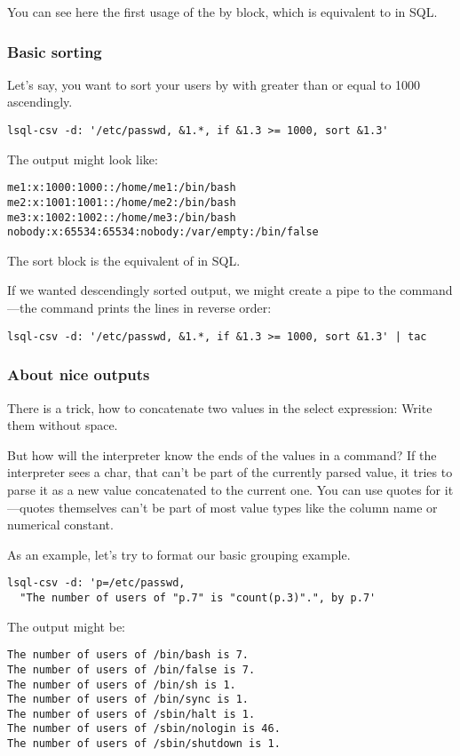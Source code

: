 You can see here the first usage of the by block, which is equivalent to  in SQL.

\subsubsection{Basic sorting}
Let's say, you want to sort your users by  with  greater than or equal to 1000 ascendingly.
\begin{verbatim}
lsql-csv -d: '/etc/passwd, &1.*, if &1.3 >= 1000, sort &1.3'
\end{verbatim}
The output might look like:
\begin{verbatim}
me1:x:1000:1000::/home/me1:/bin/bash
me2:x:1001:1001::/home/me2:/bin/bash
me3:x:1002:1002::/home/me3:/bin/bash
nobody:x:65534:65534:nobody:/var/empty:/bin/false
\end{verbatim}

The sort block is the equivalent of  in SQL.

If we wanted descendingly sorted output, we might create a pipe to the  command---the  command prints the lines in reverse order:
\begin{verbatim}
lsql-csv -d: '/etc/passwd, &1.*, if &1.3 >= 1000, sort &1.3' | tac
\end{verbatim}

\subsubsection{About nice outputs}
There is a trick, how to concatenate two values in the select expression: Write them without space.

But how will the interpreter know the ends of the values in a command? If the interpreter sees a char, that can't be part of the currently parsed value, it tries to parse it as a new value concatenated to the current one.
You can use quotes for it---quotes themselves can't be part of most value types like the column name or numerical constant.

As an example, let's try to format our basic grouping example.

\begin{verbatim}
lsql-csv -d: 'p=/etc/passwd, 
  "The number of users of "p.7" is "count(p.3)".", by p.7'
\end{verbatim}
The output might be:
\begin{verbatim}
The number of users of /bin/bash is 7.
The number of users of /bin/false is 7.
The number of users of /bin/sh is 1.
The number of users of /bin/sync is 1.
The number of users of /sbin/halt is 1.
The number of users of /sbin/nologin is 46.
The number of users of /sbin/shutdown is 1.
\end{verbatim}

